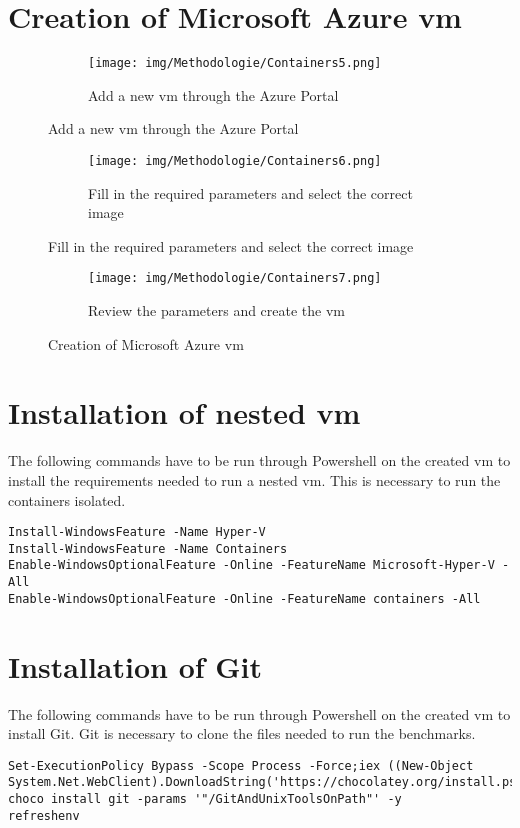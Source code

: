 \label{Containers_Azure}
\section{Creation of Microsoft Azure \acrshort{vm}}
\begin{figure}[h]
	\begin{subfigure}{\textwidth}
		\captionsetup{width=0.9\linewidth}
		\texttt{[image: img/Methodologie/Containers5.png]} 
		\centering
		\caption{Add a new \acrshort{vm} through the Azure Portal}
	\end{subfigure}
\end{figure}
\begin{figure}[h]\ContinuedFloat
	\begin{subfigure}{\textwidth}
		\captionsetup{width=0.9\linewidth}
		\texttt{[image: img/Methodologie/Containers6.png]}
		\centering
		\caption{Fill in the required parameters and select the correct image}
	\end{subfigure}
\end{figure}
\begin{figure}[h]\ContinuedFloat
	\begin{subfigure}{\textwidth}
		\captionsetup{width=0.9\linewidth}
		\texttt{[image: img/Methodologie/Containers7.png]}
		\centering
		\caption{Review the parameters and create the \acrshort{vm}}
	\end{subfigure}
	\caption[Azure \acrshort{vm} creation]{Creation of Microsoft Azure \acrshort{vm}}
	\label{fig:Container_VM}
\end{figure}
\clearpage
\section{Installation of nested \acrshort{vm}}
The following commands have to be run through Powershell on the created \acrshort{vm} to install the requirements needed to run a nested \acrshort{vm}. This is necessary to run the containers isolated.
\begin{lstlisting}[breaklines]
Install-WindowsFeature -Name Hyper-V
Install-WindowsFeature -Name Containers
Enable-WindowsOptionalFeature -Online -FeatureName Microsoft-Hyper-V -All
Enable-WindowsOptionalFeature -Online -FeatureName containers -All
\end{lstlisting}
\section{Installation of Git}
The following commands have to be run through Powershell on the created \acrshort{vm} to install Git. Git is necessary to clone the files needed to run the benchmarks.
\begin{lstlisting}[breaklines]
Set-ExecutionPolicy Bypass -Scope Process -Force;iex ((New-Object System.Net.WebClient).DownloadString('https://chocolatey.org/install.ps1'))
choco install git -params '"/GitAndUnixToolsOnPath"' -y
refreshenv
\end{lstlisting}
